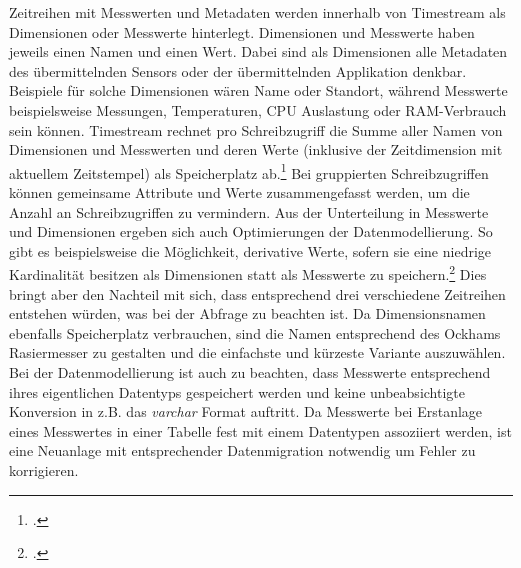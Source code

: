 Zeitreihen mit Messwerten und Metadaten werden innerhalb von Timestream als Dimensionen oder Messwerte hinterlegt. Dimensionen und Messwerte haben jeweils einen Namen und einen Wert. Dabei sind als Dimensionen alle Metadaten des übermittelnden Sensors oder der übermittelnden Applikation denkbar. Beispiele für solche Dimensionen wären Name oder Standort, während Messwerte beispielsweise \coo{} Messungen, Temperaturen, CPU Auslastung oder \ac{RAM}-Verbrauch sein können. Timestream rechnet pro Schreibzugriff die Summe aller Namen von Dimensionen und Messwerten und deren Werte (inklusive der Zeitdimension mit aktuellem Zeitstempel) als Speicherplatz ab.\footcite[Vgl. auch im Folgenden][]{AmazonWebServicesInc..o.J.bs} Bei gruppierten Schreibzugriffen können gemeinsame Attribute und Werte zusammengefasst werden, um die Anzahl an Schreibzugriffen zu vermindern.
Aus der Unterteilung in Messwerte und Dimensionen ergeben sich auch Optimierungen der Datenmodellierung. So gibt es beispielsweise die Möglichkeit, derivative Werte, sofern sie eine niedrige Kardinalität besitzen als Dimensionen statt als Messwerte zu speichern.\footcite[Vgl. auch im Folgenden][]{AmazonWebServicesInc..o.J.bt} Dies bringt aber den Nachteil mit sich, dass entsprechend drei verschiedene Zeitreihen entstehen würden, was bei der Abfrage zu beachten ist. Da Dimensionsnamen ebenfalls Speicherplatz verbrauchen, sind die Namen entsprechend des Ockhams Rasiermesser zu gestalten und die einfachste und kürzeste Variante auszuwählen. Bei der Datenmodellierung ist auch zu beachten, dass Messwerte entsprechend ihres eigentlichen Datentyps gespeichert werden und keine unbeabsichtigte Konversion in z.B. das \textit{varchar} Format auftritt. Da Messwerte bei Erstanlage eines Messwertes in einer Tabelle fest mit einem Datentypen assoziiert werden, ist eine Neuanlage mit entsprechender Datenmigration notwendig um Fehler zu korrigieren.



